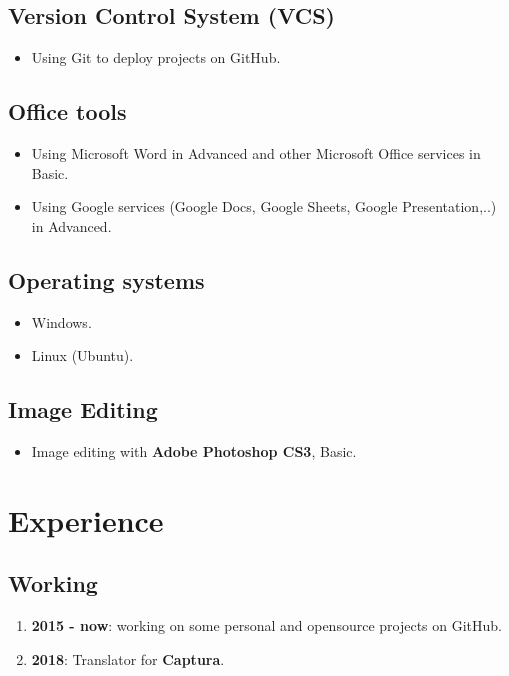 \documentclass{article}
\begin{document}
        \subsection{Version Control System (VCS)}
        \begin{itemize}
            \item Using Git to deploy projects on GitHub.
        \end{itemize}

        \subsection{Office tools}
        \begin{itemize}
            \item Using Microsoft Word in Advanced and other Microsoft Office services in Basic.
            \item Using Google services (Google Docs, Google Sheets, Google Presentation,..) in Advanced.
        \end{itemize}

        \subsection{Operating systems}
        \begin{itemize}
            \item Windows.
            \item Linux (Ubuntu).
        \end{itemize}

        \subsection{Image Editing}
        \begin{itemize}
            \item Image editing with \textbf{Adobe Photoshop CS3}, Basic.
        \end{itemize}

    \section{Experience}
        \subsection{Working}
            \begin{enumerate}
                \item \textbf{2015 - now}: working on some personal and opensource projects on GitHub.
                \item \textbf{2018}: Translator for \textbf{Captura}\cite{Captura}.
            \end{enumerate}
\end{document}
